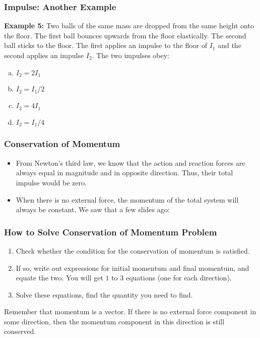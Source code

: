 \documentclass[12pt,compress,aspectratio=169]{beamer}
\newcommand{\mb}[1]{\ensuremath\mathbf{#1}}
\newcommand{\eq}[2]{\vspace{#1}{\Large\begin{displaymath}#2\end{displaymath}}}
\begin{document}
\begin{frame}
  \frametitle{Impulse: Another Example}
  \textbf{Example 5:} Two balls of the same mass are dropped from the same
  height onto the floor. The first ball bounces upwards from the floor
  elastically. The second ball sticks to the floor. The first applies an
  impulse to the floor of $I_1$ and the second applies an impulse $I_2$. The
  two impulses obey:
  \begin{enumerate}[(a)]
  \item $I_2=2I_1$
  \item $I_2=I_1/2$
  \item $I_2=4I_1$
  \item $I_2=I_1/4$
  \end{enumerate}
\end{frame}

\begin{frame}
  \frametitle{Conservation of Momentum}
  \begin{itemize}
  \item From Newton's third law, we know that the action and reaction forces are
    always equal in magnitude and in opposite direction. Thus, their total
    impulse would be zero. 
    
  \item When there is no external force, the momentum of the total system will
    always be constant. We saw that a few slides ago:

    \eq{-.2in}{
      \sum\mb{p}(t_1)=\sum\mb{p}(t_2)
    }
  \end{itemize}
\end{frame}

\begin{frame}
  \frametitle{How to Solve Conservation of Momentum Problem}
  \begin{enumerate}
  \item Check whether the condition for the conservation of momentum is
    satisfied.
  \item If so, write out expressions for initial momentum and final momentum,
    and equate the two. You will get $1$ to $3$ equations (one for each
    direction).
  \item Solve these equations, find the quantity you need to find.
  \end{enumerate}
%
  Remember that momentum is a vector. If there is no external force component
  in some direction, then the momentum component in this direction is still
  conserved.
\end{frame}
\end{document}
